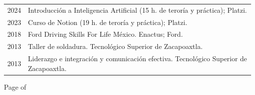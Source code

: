 \documentclass[oneside]{article}
\begin{document}
{\begin{minipage}[t][\dimexpr\textheight-2\fboxrule-2\fboxsep\relax][t]{\dimexpr0.6\textwidth-2\fboxrule-2\fboxsep\relax}
\begin{justify}
        \begin{tabularx}{\textwidth}{cY}
            2024 & Introducción a Inteligencia Artificial (15 h. de teroría y práctica); Platzi. \\
            2023 & Curso de Notion (19 h. de teroría y práctica); Platzi. \\
            2018 & Ford Driving Skills For Life México. Enactus; Ford. \\
            2013 & Taller de soldadura. Tecnológico Superior de Zacapoaxtla. \\
            2013 & Liderazgo e integración y comunicación efectiva. Tecnológico Superior de Zacapoaxtla. \\
        \end{tabularx}

        \end{justify}
        \vfill%
        {\hfill\small{}\selectfont Page \thepage of \pageref{LastPage}\hfill}
    \end{minipage}
}
\hfill%
\end{document}
